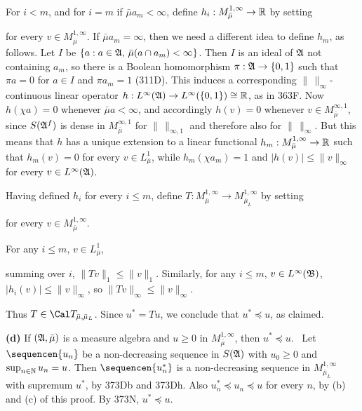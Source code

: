{For $i<m$, and for $i=m$ if $\bar\mu a_m<\infty$, define
$h_i:M^{1,\infty}_{\bar\mu}\to\Bbb R$ by setting
     
     
\noindent for every $v\in M^{1,\infty}_{\bar\mu}$.   If $\bar\mu
a_m=\infty$, then we need a different idea to define $h_m$, as follows.
Let $I$ be $\{a:a\in\frak A,\,\bar\mu(a\cap a_m)<\infty\}$.   Then $I$
is an ideal of $\frak A$ not containing $a_m$, so there is a Boolean
homomorphism
$\pi:\frak A\to\{0,1\}$ such that $\pi a=0$ for $a\in I$ and $\pi a_m=1$
(311D).   This induces a corresponding $\|\,\|_{\infty}$-continuous
linear operator
$h:L^{\infty}(\frak A)\to L^{\infty}(\{0,1\})\cong\Bbb R$, as in 363F.
Now $h(\chi a)=0$ whenever $\bar\mu a<\infty$, and accordingly $h(v)=0$
whenever $v\in M^{\infty,1}_{\bar\mu}$, since $S(\frak A^f)$ is dense in
$M^{\infty,1}_{\bar\mu}$ for $\|\,\|_{\infty,1}$ and therefore also for
$\|\,\|_{\infty}$.   But this means
that $h$ has a unique extension to a linear functional
$h_m:M^{1,\infty}_{\bar\mu}\to\Bbb R$ such that $h_m(v)=0$ for every
$v\in L^1_{\bar\mu}$, while $h_m(\chi a_m)=1$ and
$|h(v)|\le\|v\|_{\infty}$ for every $v\in L^{\infty}(\frak A)$.
     
Having defined $h_i$ for every $i\le m$, define
$T:M^{1,\infty}_{\bar\mu}\to M^{1,\infty}_{\bar\mu_L}$ by setting
     
     
\noindent for every $v\in M^{1,\infty}_{\bar\mu}$.
     
For any $i\le m$, $v\in L^1_{\bar\mu}$,
     
     
\noindent summing over $i$, $\|Tv\|_1\le\|v\|_1$.   Similarly, for any
$i\le m$, $v\in L^{\infty}(\frak B)$, $|h_i(v)|\le\|v\|_{\infty}$, so
$\|Tv\|_{\infty}\le\|v\|_{\infty}$.
     
Thus $T\in\Cal T_{\bar\mu,\bar\mu_L}$.   Since $u^*=Tu$, we conclude
that $u^*\preccurlyeq u$, as claimed.\ \Qed
     
\medskip
     
{\bf (d)} If $(\frak A,\bar\mu)$ is a measure algebra and $u\ge 0$ in
$M^{1,\infty}_{\bar\mu}$, then $u^*\preccurlyeq u$.   \Prf\ Let
$\sequencen{u_n}$ be a non-decreasing sequence in $S(\frak A)$ with
$u_0\ge 0$ and $\sup_{n\in\Bbb N}u_n=u$.   Then $\sequencen{u_n^*}$ is a
non-decreasing sequence in $M^{1,\infty}_{\bar\mu_L}$ with supremum
$u^*$, by 373Db and 373Dh.   Also $u_n^*\preccurlyeq u_n\preccurlyeq u$
for every $n$, by (b) and (c) of this proof.   By 373N, $u^*\preccurlyeq
u$.\ \Qed
     
}
